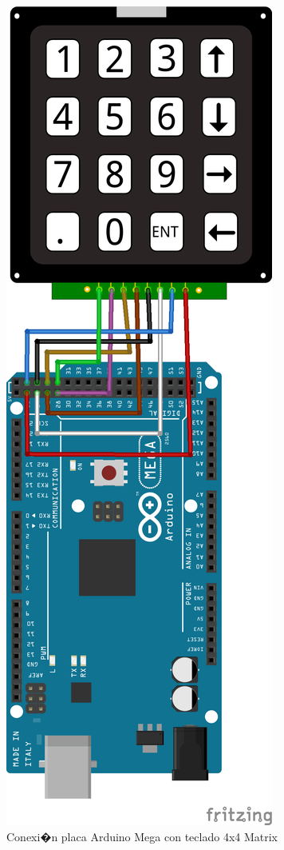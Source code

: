 \documentclass[11pt,twoside]{book}
\begin{document}
\begin{figure}[H]
	\begin{center}
		\includegraphics[scale=0.8]{images/conexionArduinoKeypad.png}
	\end{center}
	\caption{Conexi�n placa Arduino Mega con teclado 4x4 Matrix}
	\label{fig:ConexionESP8266}
\end{figure}
\end{document}
